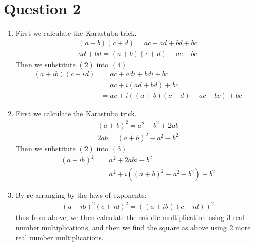\documentclass{article}
\begin{document}
\section*{Question 2}
\begin{enumerate}[label=\alph*)]
    \item
        First we calculate the Karastuba trick.
        \setcounter{equation}{0}
        \begin{gather}
            (a + b)(c + d) = ac + ad + bd + bc \\
            ad + bd = (a + b)(c + d) - ac - bc
        \end{gather}
        Then we substitute $(2)$ into $(4)$
        \begin{align}
            (a + ib)(c + id) &= ac + adi + bdi + bc \\
            &= ac + i(ad + bd) + bc \\
            &= ac + i((a + b)(c + d) - ac - bc) + bc
        \end{align}
    \item
        \setcounter{equation}{0}
        First we calculate the Karastuba trick.
        \begin{gather}
            (a + b)^2 = a^2 + b^2 + 2ab \\
            2ab = (a + b)^2 - a^2 - b^2
        \end{gather}
        Then we substitute $(2)$ into $(3)$
        \begin{align}
            (a + ib)^2 &= a^2 + 2abi - b^2 \\
            &= a^2 + i((a + b)^2 - a^2 - b^2) - b^2
        \end{align}
    \item
        \setcounter{equation}{0}
        By re-arranging by the laws of exponents:
        \begin{gather*}
            (a+ib)^2(c+id)^2 = ((a+ib)(c+id))^2
        \end{gather*}
        thus from above, we then calculate the middle multiplication using
        3 real number multiplications, and then we find the square as above
        using 2 more real number multiplications.
\end{enumerate}

\pagebreak
\end{document}
